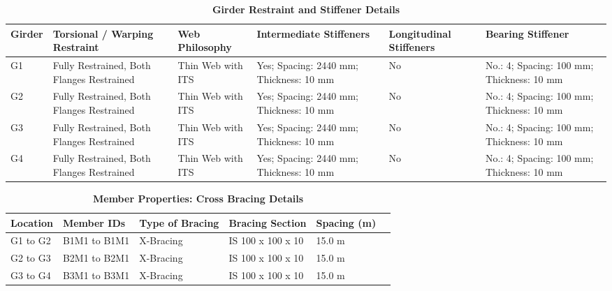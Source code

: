 \documentclass[12pt,a4paper]{report}
\numberwithin{table}{chapter}
\numberwithin{figure}{chapter}
\begin{document}
\vspace{4pt}
\begin{longtable}{|L{1.4cm}|p{2.2cm}|p{2.2cm}|p{3.0cm}|p{2.4cm}|p{2.2cm}|}
\caption{\textbf{Girder Restraint and Stiffener Details}}\\
\hline
\textbf{Girder} & \textbf{Torsional / Warping Restraint} & \textbf{Web Philosophy} & \textbf{Intermediate Stiffeners} & \textbf{Longitudinal Stiffeners} & \textbf{Bearing Stiffener} \\[6pt]
\hline
\endfirsthead
\endhead

G1 & Fully Restrained, Both Flanges Restrained & Thin Web with ITS & Yes; Spacing: 2440 mm; Thickness: 10 mm & No & No.: 4; Spacing: 100 mm; Thickness: 10 mm \\[8pt]
\hline
G2 & Fully Restrained, Both Flanges Restrained & Thin Web with ITS & Yes; Spacing: 2440 mm; Thickness: 10 mm & No & No.: 4; Spacing: 100 mm; Thickness: 10 mm \\[8pt]
\hline
G3 & Fully Restrained, Both Flanges Restrained & Thin Web with ITS & Yes; Spacing: 2440 mm; Thickness: 10 mm & No & No.: 4; Spacing: 100 mm; Thickness: 10 mm \\[8pt]
\hline
G4 & Fully Restrained, Both Flanges Restrained & Thin Web with ITS & Yes; Spacing: 2440 mm; Thickness: 10 mm & No & No.: 4; Spacing: 100 mm; Thickness: 10 mm \\[8pt]
\hline
\end{longtable}



\newpage

\vspace{0.4em}
\setlength{\tabcolsep}{4pt}
\setlength\LTleft{0pt}
\setlength\LTright{\fill}

\begin{longtable}{|L{2.2cm}|L{2.2cm}|L{3.0cm}|L{2.5cm}|C{1.8cm}|C{1.8cm}|}
\caption{\textbf{Member Properties: Cross Bracing Details}}
\hline
\textbf{Location} & \textbf{Member IDs} & \textbf{Type of Bracing} & \textbf{Bracing Section} & \textbf{Spacing (m)} \\
\hline
G1 to G2 & B1M1 to B1M1 & X-Bracing & IS 100 x 100 x 10 & 15.0 m \\[6pt]
\hline
G2 to G3 & B2M1 to B2M1 & X-Bracing & IS 100 x 100 x 10 & 15.0 m \\[6pt]
\hline
G3 to G4 & B3M1 to B3M1 & X-Bracing & IS 100 x 100 x 10 & 15.0 m \\[6pt]
\hline
\end{longtable}

\vspace{0.4em}
\noindent
\setlength{\tabcolsep}{4pt}
\setlength\LTleft{0pt}
\setlength\LTright{\fill}
\end{document}
